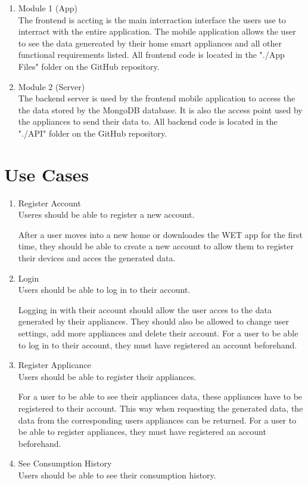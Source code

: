 \documentclass[10pt]{article}
\begin{document}
\begin{multicols*}{2}
\begin{enumerate}
  \item {Module 1 (App)} \\
  The frontend is accting is the main interraction interface the users use to interract with the entire application. The mobile application allows the user to see the data genereated by their home smart appliances and all other functional requirements listed.
  All frontend code is located in the "./App Files" folder on the GitHub repository.
  \item {Module 2 (Server)} \\
  The backend server is used by the frontend mobile application to access the the data stored by the MongoDB database. It is also the access point used by the appliances to send their data to.
  All backend code is located in the "./API" folder on the GitHub repository.
\end{enumerate}

\clearpage

\section{Use Cases}
\begin{enumerate}
  \item {Register Account} \\
  Useres should be able to register a new account.

  After a user moves into a new home or downloades the WET app for the first time, they should be able to create a new account to allow them to register their devices and acces the generated data.
  \item {Login} \\
  Users should be able to log in to their account.

  Logging in with their account should allow the user acces to the data generated by their appliances. They should also be allowed to change user settings, add more appliances and delete their account.
  For a user to be able to log in to their account, they must have registered an account beforehand.
  \item {Register Applicance} \\
  Users should be able to register their appliances.

  For a user to be able to see their appliances data, these appliances have to be registered to their account. This way when requesting the generated data, the data from the corresponding users appliances can be returned.
  For a user to be able to register appliances, they must have registered an account beforehand.
  \item {See Consumption History} \\
  Users should be able to see their consumption history.
\end{enumerate}


\end{multicols*}
\end{document}
